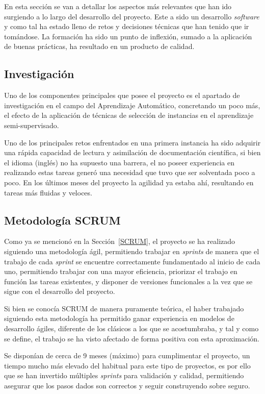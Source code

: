 
En esta sección se van a detallar los aspectos más relevantes que han ido surgiendo a lo largo del desarrollo del proyecto. Este a sido un desarrollo \textit{software} y como tal ha estado lleno de retos y decisiones técnicas que han tenido que ir tomándose. La formación ha sido un punto de inflexión, sumado a la aplicación de buenas prácticas, ha resultado en un producto de calidad.


\subsection{Investigación}
Uno de los componentes principales que posee el proyecto es el apartado de investigación en el campo del Aprendizaje Automático, concretando un poco más, el efecto de la aplicación de técnicas de selección de instancias en el aprendizaje semi-supervisado.

Uno de los principales retos enfrentados en una primera instancia ha sido adquirir una rápida capacidad de lectura y asimilación de documentación científica, si bien el idioma (inglés) no ha supuesto una barrera, el no poseer experiencia en realizando estas tareas  generó una necesidad que tuvo que ser solventada poco a poco. En los últimos meses del proyecto la agilidad ya estaba ahí, resultando en tareas más fluidas y veloces.

\subsection{Metodología SCRUM}
Como ya se mencionó en la Sección~\ref{SCRUM}, el proyecto se ha realizado siguiendo una metodología ágil, permitiendo trabajar en \textit{sprints} de manera que el trabajo de cada \textit{sprint} se encuentre correctamente fundamentado al inicio de cada uno, permitiendo trabajar con una mayor eficiencia, priorizar el trabajo en función las tareas existentes, y disponer de versiones funcionales a la vez que se sigue con el desarrollo del proyecto.

Si bien se conocía SCRUM de manera puramente teórica, el haber trabajado siguiendo esta metodología ha permitido ganar experiencia en modelos de desarrollo ágiles, diferente de los clásicos a los que se acostumbraba, y tal y como se define, el trabajo se ha visto afectado de forma positiva con esta aproximación.

Se disponían de cerca de 9 meses (máximo) para cumplimentar el proyecto, un tiempo mucho más elevado del habitual para este tipo de proyectos, es por ello que se han invertido múltiples \textit{sprints} para validación y calidad, permitiendo asegurar que los pasos dados son correctos y seguir construyendo sobre seguro.

